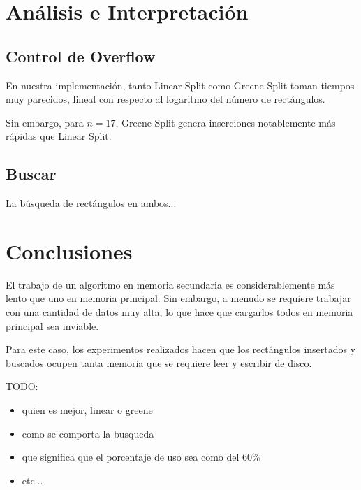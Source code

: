 \documentclass[letterpaper,10pt]{article}
\begin{document}
	\newpage

	\section{Análisis e Interpretación}

	\subsection{Control de Overflow}

	En nuestra implementación, tanto Linear Split como Greene Split toman tiempos muy parecidos, lineal con respecto al logaritmo del número de rectángulos.

	Sin embargo, para $n = 17$, Greene Split genera inserciones notablemente más rápidas que Linear Split.

	\subsection{Buscar}

	La búsqueda de rectángulos en ambos...

	\newpage

	\section{Conclusiones}

	El trabajo de un algoritmo en memoria secundaria es considerablemente más lento que uno en memoria principal. Sin embargo, a menudo se requiere trabajar con una cantidad de datos
	muy alta, lo que hace que cargarlos todos en memoria principal sea inviable.

	Para este caso, los experimentos realizados hacen que los rectángulos insertados y buscados ocupen tanta memoria que se requiere leer y escribir de disco.

	\vspace*{10px}

	TODO:
	\begin{itemize}
		\item quien es mejor, linear o greene
		\item como se comporta la busqueda
		\item que significa que el porcentaje de uso sea como del 60\%
		\item etc...
	\end{itemize}
\end{document}

